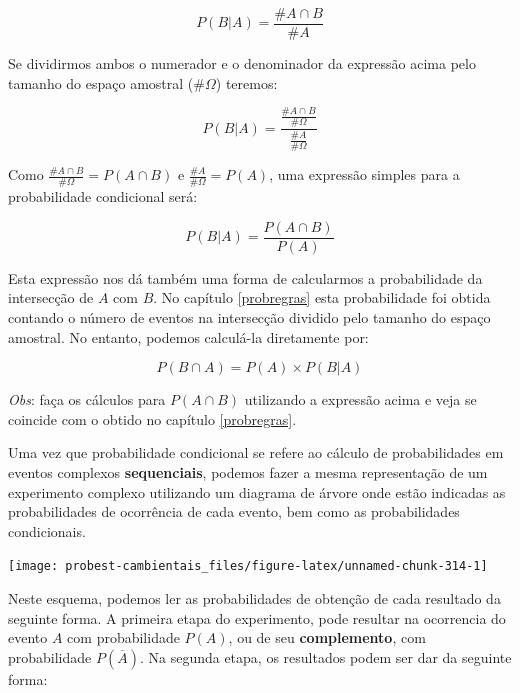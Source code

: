 \documentclass[
]{book}
\begin{document}
\[P(B|A) = \frac{\#A \cap B}{\#A}\]

Se dividirmos ambos o numerador e o denominador da expressão acima pelo tamanho do espaço amostral (\(\#\Omega\)) teremos:

\[P(B|A) = \frac{\frac{\#A \cap B}{\#\Omega}}{\frac{\#A}{\#\Omega}}\]

Como \(\frac{\#A \cap B}{\#\Omega} = P(A \cap B)\) e \(\frac{\#A}{\#\Omega} = P(A)\), uma expressão simples para a probabilidade condicional será:

\[P(B|A) = \frac{P(A \cap B)}{P(A)}\]

Esta expressão nos dá também uma forma de calcularmos a probabilidade da intersecção de \(A\) com \(B\). No capítulo \ref{probregras} esta probabilidade foi obtida contando o número de eventos na intersecção dividido pelo tamanho do espaço amostral. No entanto, podemos calculá-la diretamente por:

\[P(B \cap A) = P(A) \times P(B|A)\]

\emph{Obs}: faça os cálculos para \(P(A \cap B)\) utilizando a expressão acima e veja se coincide com o obtido no capítulo \ref{probregras}.

Uma vez que probabilidade condicional se refere ao cálculo de probabilidades em eventos complexos \textbf{sequenciais}, podemos fazer a mesma representação de um experimento complexo utilizando um diagrama de árvore onde estão indicadas as probabilidades de ocorrência de cada evento, bem como as probabilidades condicionais.

\begin{center}\texttt{[image: probest-cambientais\_files/figure-latex/unnamed-chunk-314-1]} \end{center}

Neste esquema, podemos ler as probabilidades de obtenção de cada resultado da seguinte forma. A primeira etapa do experimento, pode resultar na ocorrencia do evento \(A\) com probabilidade \(P(A)\), ou de seu \textbf{complemento}, com probabilidade \(P(\overline{A})\). Na segunda etapa, os resultados podem ser dar da seguinte forma:
\end{document}
